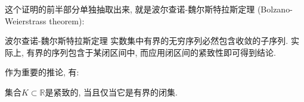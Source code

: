 这个证明的前半部分单独抽取出来, 就是波尔查诺-魏尔斯特拉斯定理 (Bolzano-Weierstrass theorem):
\begin{theorem}{波尔查诺-魏尔斯特拉斯定理}
实数集中有界的无穷序列必然包含收敛的子序列. 实际上, 有界的序列包含于某闭区间中, 而应用闭区间的紧致性即可得到结论.
\end{theorem}

作为重要的推论, 有:
\begin{theorem}{}
集合$K\subset\mathbb{R}$是紧致的, 当且仅当它是有界的闭集.
\end{theorem}